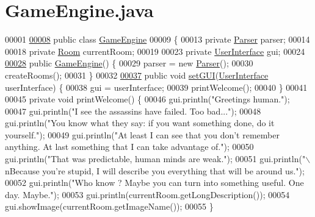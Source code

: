 \hypertarget{GameEngine_8java_source}{\section{Game\-Engine.\-java}
}

\begin{DoxyCode}
00001 
\hypertarget{GameEngine_8java_source_l00008}{}\hyperlink{classGameEngine}{00008} \textcolor{keyword}{public} \textcolor{keyword}{class }\hyperlink{classGameEngine}{GameEngine}
00009 \{
00013     \textcolor{keyword}{private} \hyperlink{classParser}{Parser} parser;
00014 
00018     \textcolor{keyword}{private} \hyperlink{classRoom}{Room} currentRoom;
00019 
00023     \textcolor{keyword}{private} \hyperlink{classUserInterface}{UserInterface} gui;
00024 
\hypertarget{GameEngine_8java_source_l00028}{}\hyperlink{classGameEngine_a9e8a92f5021a34293060f9aaff4005de}{00028}     \textcolor{keyword}{public} \hyperlink{classGameEngine_a9e8a92f5021a34293060f9aaff4005de}{GameEngine}() \{
00029         parser = \textcolor{keyword}{new} \hyperlink{classParser}{Parser}();
00030         createRooms();
00031     \}
00032 
\hypertarget{GameEngine_8java_source_l00037}{}\hyperlink{classGameEngine_aec901a5b590b3cd204f196165da5dfb6}{00037}     \textcolor{keyword}{public} \textcolor{keywordtype}{void} \hyperlink{classGameEngine_aec901a5b590b3cd204f196165da5dfb6}{setGUI}(\hyperlink{classUserInterface}{UserInterface} userInterface) \{
00038         gui = userInterface;
00039         printWelcome();
00040     \}
00041 
00045     \textcolor{keyword}{private} \textcolor{keywordtype}{void} printWelcome() \{
00046         gui.println(\textcolor{stringliteral}{"Greetings human."});
00047         gui.println(\textcolor{stringliteral}{"I see the assassins have failed. Too bad..."});
00048         gui.println(\textcolor{stringliteral}{"You know what they say: if you want something done, do it yourself."});
00049         gui.println(\textcolor{stringliteral}{"At least I can see that you don't remember anything. At last something that I can take
       advantage of."});
00050         gui.println(\textcolor{stringliteral}{"That was predictable, human minds are weak."});
00051         gui.println(\textcolor{stringliteral}{"\(\backslash\)nBecause you're stupid, I will describe you everything that will be around us."});
00052         gui.println(\textcolor{stringliteral}{"Who know ? Maybe you can turn into something useful. One day. Maybe."});
00053         gui.println(currentRoom.getLongDescription());
00054         gui.showImage(currentRoom.getImageName());
00055     \}

\end{DoxyCode}
